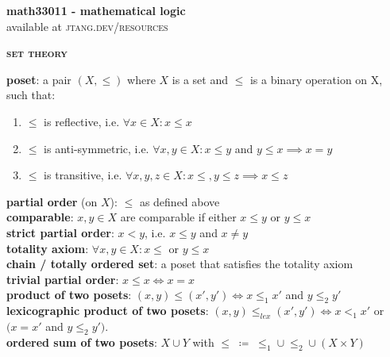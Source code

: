 \documentclass[a4paper]{article}
\begin{document}
	
\begin{center}
	\huge{\textbf{math33011 - mathematical logic}}\\
	\small{available at \textsc{jtang.dev/resources}}\\
\end{center}


\begin{framed}
	\begin{center}
		\textbf{\textsc{set theory}}
	\end{center}
	\textbf{poset}: a pair $(X, \leq)$ where $X$ is a set and $\leq$ is a binary operation on X, such that:
	\begin{enumerate}[label=(\roman*), itemsep=-3pt, topsep=0pt]
		\item $\leq$ is reflective, i.e. $\forall x \in X: x \leq x$
		\item $\leq$ is anti-symmetric, i.e. $\forall x, y \in X: x \leq y$ and $y \leq x \implies x = y$
		\item $\leq$ is transitive, i.e. $\forall x, y, z \in X: x \leq, y \leq z \implies x \leq z$
	\end{enumerate}

	\noindent
	\textbf{partial order} (on $X$): $\leq$ as defined above\\
	\textbf{comparable}: $x, y \in X$ are comparable if either $x \leq y$ or $y \leq x$\\
	\textbf{strict partial order}: $x < y$, i.e. $x \leq y$ and $x \neq y$\\
	\textbf{totality axiom}: $\forall x, y \in X: x \leq$ or $y \leq x$\\
	\textbf{chain / totally ordered set}: a poset that satisfies the totality axiom\\
	\textbf{trivial partial order}: $x \leq x \iff x = x$\\
	\textbf{product of two posets}: $(x, y) \leq (x', y') \iff x \leq_1 x'$ and $y \leq_2 y'$\\
	\textbf{lexicographic product of two posets}: $(x, y) \leq_{lex} (x', y') \iff x <_1 x'$ or $(x = x'$ and $y \leq_2 y').$\\
	\textbf{ordered sum of two posets}: $X \cup Y$ with $\leq \; \coloneqq \; \leq_1 \cup \leq_2 \cup (X \times Y)$\\
	

\end{framed}
\end{document}
